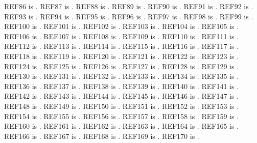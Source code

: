 \documentclass[12pt]{report}
\begin{document}
REF86 is \cite{ChothiaCet94}.
REF87 is \cite{TaylorWR94a}.
REF88 is \cite{JonesDTet94a}.
REF89 is \cite{TaylorWRet94a}.
REF90 is \cite{HatrickKet94a}.
REF91 is \cite{OrengoCAet94a}.
REF92 is \cite{AszodiAet94a}.
REF93 is \cite{TaylorWRet94b}.
REF94 is \cite{JonesDTet94b}.
REF95 is \cite{AszodiAet94b}.
REF96 is \cite{TaylorWR94b}.
REF97 is \cite{TaylorWRet94c}.
REF98 is \cite{TaylorWR94c}.
REF99 is \cite{AszodiAet94c}.
REF100 is \cite{TaylorWRet94d}.
REF101 is \cite{TaylorWRet94e}.
REF102 is \cite{TaylorWRet95a}.
REF103 is \cite{AszodiAet95a}.
REF104 is \cite{TaylorWR95a}.
REF105 is \cite{TaylorWR95b}.
REF106 is \cite{TaylorWRet95b}.
REF107 is \cite{AszodiAet95b}.
REF108 is \cite{AszodiAet95c}.
REF109 is \cite{BrownNPet96}.
REF110 is \cite{OrengoCAet96}.
REF111 is \cite{TaylorWR96a}.
REF112 is \cite{AszodiAet96a}.
REF113 is \cite{WernerEet96a}.
REF114 is \cite{TaylorWR96b}.
REF115 is \cite{TaylorWR96c}.
REF116 is \cite{HeringaJet97}.
REF117 is \cite{AszodiAet97a}.
REF118 is \cite{TaylorWRet97a}.
REF119 is \cite{PollockDDet97a}.
REF120 is \cite{TaylorWR97b}.
REF121 is \cite{AszodiAet97b}.
REF122 is \cite{TaylorWR97c}.
REF123 is \cite{AszodiAet97c}.
REF124 is \cite{TaylorWRet97c}.
REF125 is \cite{TaylorWR97d}.
REF126 is \cite{TaylorWR97e}.
REF127 is \cite{JonesDTet98}.
REF128 is \cite{RittingerKet98}.
REF129 is \cite{HigginsDGet98}.
REF130 is \cite{WernerEet98}.
REF131 is \cite{TaylorWR98a}.
REF132 is \cite{MunroREJet99}.
REF133 is \cite{JonassenIet99}.
REF134 is \cite{PollockDDet99a}.
REF135 is \cite{TaylorWR99a}.
REF136 is \cite{TaylorWRet99a}.
REF137 is \cite{TaylorWRet99b}.
REF138 is \cite{TaylorWR99b}.
REF139 is \cite{TaylorWR99c}.
REF140 is \cite{TaylorWRet99c}.
REF141 is \cite{EidhammerIet00}.
REF142 is \cite{JonassenIet00a}.
REF143 is \cite{TaylorWR00a}.
REF144 is \cite{HigginsDGet00a}.
REF145 is \cite{HigginsDGet00b}.
REF146 is \cite{TaylorWR00b}.
REF147 is \cite{TaylorWR00c}.
REF148 is \cite{TaylorWR00d}.
REF149 is \cite{OgunMet01}.
REF150 is \cite{TaylorWR01a}.
REF151 is \cite{TaylorWRet01b}.
REF152 is \cite{JonassenIet02}.
REF153 is \cite{ConklinDet02}.
REF154 is \cite{TaylorWR02a}.
REF155 is \cite{SaldanhaJWet02a}.
REF156 is \cite{TaylorWRet02a}.
REF157 is \cite{LinKet02a}.
REF158 is \cite{LinKet02b}.
REF159 is \cite{TaylorWR02b}.
REF160 is \cite{TaylorWR02c}.
REF161 is \cite{LinKet02c}.
REF162 is \cite{LinKet03a}.
REF163 is \cite{PetersenKet03a}.
REF164 is \cite{TaylorWRet03a}.
REF165 is \cite{MombelliEet03a}.
REF166 is \cite{TaylorWRet03b}.
REF167 is \cite{TaylorWRet03c}.
REF168 is \cite{StevensAet04}.
REF169 is \cite{MurrayKBet04}.
REF170 is \cite{JohannissenLOet04}.
\end{document}
